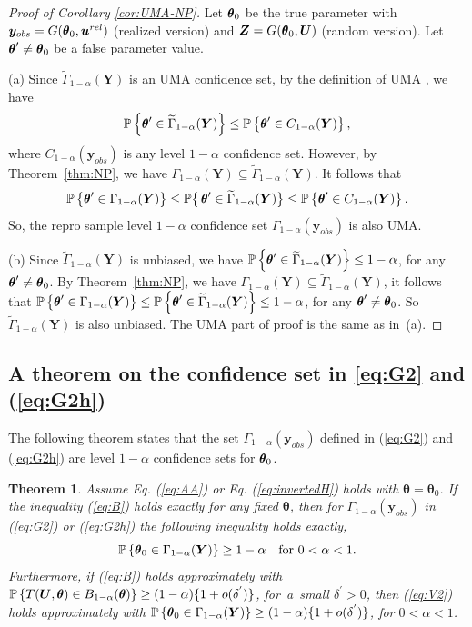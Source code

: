 \documentclass[12pt]{article}
\theoremstyle{shortspace}
\newtheorem{theorem}{Theorem}
\def\*#1{\bm{#1}}
\def\btheta{\mathop{\theta\kern-.45em\hbox{$\theta$}}\nolimits}
\def\P{\mathbb P}
\begin{document}
\begin{proof}[Proof of Corollary \ref{cor:UMA-NP}]

 Let $\btheta_0$ be the true parameter with $\*y_{obs} = G(\btheta_0, \*u^{rel})$ (realized version) and $\*Z = G(\btheta_0, \*U)$ (random version). Let $\btheta' \not = \btheta_0$ be a false parameter value. 

(a) Since $\widetilde
\Gamma_{1-\alpha}(\*Y)$ is an UMA confidence set, by the definition of UMA \citep[][Section 9.2.1]{tCAS90a}, we have 
$$
\P\left\{\btheta' \in \widetilde
\Gamma_{1-\alpha}(\*Y) \right\} \leq \P\left\{ \btheta' \in C_{1-\alpha}(\*Y) \right\},
$$
where $C_{1-\alpha}(\*y_{obs})$ is any level $1 - \alpha$ confidence set. However, by Theorem~\ref{thm:NP}, we have $\Gamma_{1-\alpha}(\*Y) \subseteq \widetilde \Gamma_{1-\alpha}(\*Y)$. It follows that
$$
\P\left\{\btheta' \in 
\Gamma_{1-\alpha}(\*Y) \right\} \leq 
\P\big\{\btheta' \in \widetilde
\Gamma_{1-\alpha}(\*Y) \big\} \leq \P\left\{ \btheta' \in C_{1-\alpha}(\*Y) \right\}.
$$
So, the repro sample level $1 - \alpha$ confidence set $\Gamma_{1-\alpha}(\*y_{obs})$ is also UMA. 

(b) Since $\widetilde \Gamma_{1-\alpha}(\*Y)$ is unbiased, we have $\P\left\{\btheta' \in \widetilde \Gamma_{1-\alpha}(\*Y)\right\} \leq 1-\alpha $, for any $\btheta' \not = \btheta_0$. By Theorem~\ref{thm:NP}, we have $\Gamma_{1-\alpha}(\*Y) \subseteq \widetilde \Gamma_{1-\alpha}(\*Y)$, it follows that $\P\left\{\btheta' \in \Gamma_{1-\alpha}(\*Y)\right\} \leq \P\left\{\btheta' \in \widetilde \Gamma_{1-\alpha}(\*Y)\right\} \leq 1-\alpha$, for any $\btheta' \not = \btheta_0$. So $\widetilde \Gamma_{1-\alpha}(\*Y)$ is also unbiased. The UMA part of proof is the same as in~(a). 
\end{proof}


\subsection{A theorem on the confidence set in \eqref{eq:G2} and (\ref{eq:G2h})}
\label{sec:the_G2}
The following theorem states that the set $\Gamma_{1-\alpha}(\*y_{obs})$ defined in (\ref{eq:G2}) and (\ref{eq:G2h}) are level $1 -\alpha$ confidence sets for $\btheta_0$. 

\begin{theorem}\label{thm:2} Assume Eq. (\ref{eq:AA}) or Eq. (\ref{eq:invertedH}) holds with $\*\theta = \*\theta_0$. If the inequality (\ref{eq:B}) holds exactly for any fixed $\*\theta$, then for $\Gamma_{1-\alpha}(\*y_{obs})$  in (\ref{eq:G2}) or (\ref{eq:G2h}) the following inequality holds exactly, 
\begin{equation}
\label{eq:V2}
\P\left\{ {\btheta}_0 \in \Gamma_{1-\alpha}(\*Y)\right\} \ge 1- \alpha 
\quad
\hbox{for $0< \alpha <1$.}
\end{equation}
Furthermore, if (\ref{eq:B}) holds approximately 
with $\P \left\{T(\*U, \btheta)  \in B_{1 -\alpha}(\btheta) \right\}\ge (1-\alpha)\{1 + o(\delta^{'})\}$, for~a~small $\delta^{'} > 0$, then (\ref{eq:V2}) holds approximately 
with $\P\left\{ {\btheta}_0 \in \Gamma_{1-\alpha}(\*Y)\right\} \ge (1-\alpha)\{1 + o(\delta^{'})\}$, for $0< \alpha <1$. 
\end{theorem}
\end{document}

